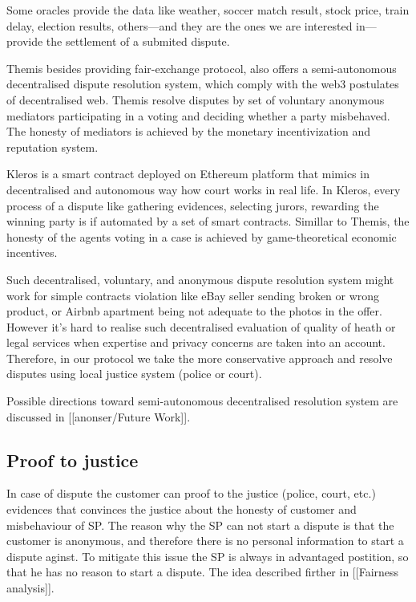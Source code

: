 \documentclass{ieeeaccess}
\begin{document}
Some oracles provide the data like weather, soccer match result, stock
price, train delay, election results, others---and they are the ones we
are interested in---provide the settlement of a submited dispute.


Themis \cite{meng2019themis} besides providing fair-exchange protocol,
also offers a semi-autonomous decentralised dispute resolution system,
which comply with the web3 postulates of decentralised web. Themis
resolve disputes by set of voluntary anonymous mediators participating
in a voting and deciding whether a party misbehaved. The honesty of
mediators is achieved by the monetary incentivization and reputation
system.

Kleros \cite{lesaege2018kleros} is a smart contract deployed on
Ethereum platform that mimics in decentralised and autonomous way how
court works in real life. In Kleros, every process of a dispute like
gathering evidences, selecting jurors, rewarding the winning party is if
automated by a set of smart contracts. Simillar to Themis, the honesty
of the agents voting in a case is achieved by game-theoretical economic
incentives.

Such decentralised, voluntary, and anonymous dispute resolution system
might work for simple contracts violation like eBay seller sending
broken or wrong product, or Airbnb apartment being not adequate to the
photos in the offer. However it's hard to realise such decentralised
evaluation of quality of heath or legal services when expertise and
privacy concerns are taken into an account. Therefore, in our protocol
we take the more conservative approach and resolve disputes using local
justice system (police or court).

Possible directions toward semi-autonomous decentralised resolution
system are discussed in {[}{[}anonser/Future Work{]}{]}.


\subsection{Proof to justice}
In case of dispute the customer can proof to the justice (police, court,
etc.) evidences that convinces the justice about the honesty of customer
and misbehaviour of SP. The reason why the SP can not start a dispute is
that the customer is anonymous, and therefore there is no personal
information to start a dispute aginst. To mitigate this issue the SP is
always in advantaged postition, so that he has no reason to start a
dispute. The idea described firther in {[}{[}Fairness analysis{]}{]}.
\end{document}
